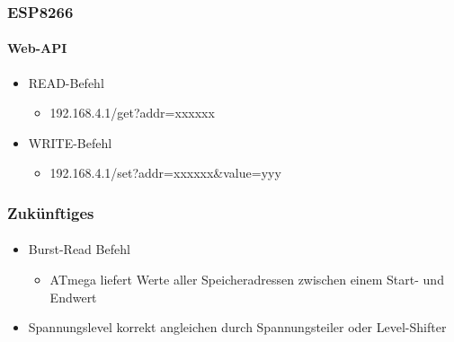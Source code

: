 \documentclass{beamer}
\begin{document}
\begin{frame}

	\frametitle{ESP8266}
	\framesubtitle{Web-API}
	\begin{itemize}
		\item READ-Befehl
		\begin{itemize}
			\item 192.168.4.1/get?addr=xxxxxx
		\end{itemize}
		\item WRITE-Befehl
		\begin{itemize}
			\item 192.168.4.1/set?addr=xxxxxx\&value=yyy
		\end{itemize}
	\end{itemize}
	
\end{frame}

\begin{frame}

	\frametitle{Zukünftiges}
	\framesubtitle{}
	\begin{itemize}
		\item Burst-Read Befehl
		\begin{itemize}
			\item ATmega liefert Werte aller Speicheradressen zwischen einem Start- und Endwert
		\end{itemize}
		\item Spannungslevel korrekt angleichen durch Spannungsteiler oder Level-Shifter
	\end{itemize}
	
\end{frame}

\end{document}
